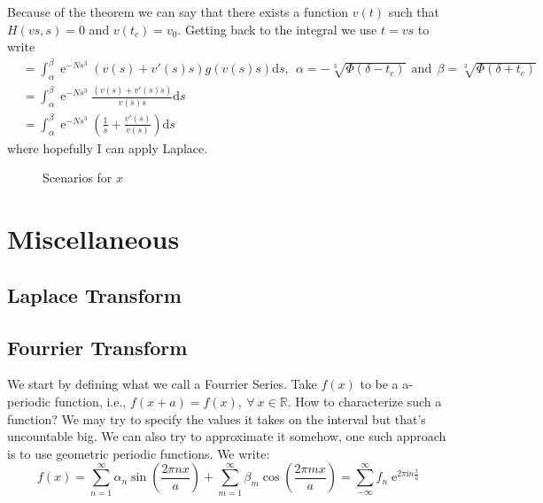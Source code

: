 \documentclass[]{report}
\DeclareMathOperator{\ee}{e}
\newcommand{\R}{\mathbb{R}}
\newcommand{\ii}{\mathrm{i}}
\newcommand{\dd}{\mathrm{d}}
\numberwithin{equation}{section} %
\begin{document}
Because of the theorem we can say that there exists a function $v(t)$ such that $H(vs, s) = 0$ and $v(t_c) = v_0$. Getting back to the integral we use $t = vs$ to write
\begin{equation}
	\begin{split}
		& = \int_{\alpha}^{\beta} \ee^{-Ns^3} (v(s) + v'(s)s) g(v(s)s) \dd s, \ \ \alpha = - \sqrt[3]{\Phi(\delta - t_c)} \ \ \text{and} \ \ \beta = \sqrt[3]{\Phi(\delta + t_c)} \\
		&  = \int_{\alpha}^{\beta} \ee^{-Ns^3} \frac{(v(s) + v'(s)s)}{v(s) s} \dd s \\
		& = \int_{\alpha}^{\beta} \ee^{-Ns^3} \left( \frac{1}{s} + \frac{v'(s)}{v(s)} \right) \dd s
	\end{split}
\end{equation}
where hopefully I can apply Laplace.

 
\begin{figure}[h] 
	\centering
	\caption{Scenarios for $x$}
	\label{Fig: x cases for hermite}
\end{figure}

\chapter{Miscellaneous}

\section{Laplace Transform}

\section{Fourrier Transform}

We start by defining what we call a Fourrier Series. Take $f(x)$ to be a a-periodic function, i.e., $f(x+a) = f(x), \ \forall \ x \in \R$. How to characterize such a function? We may try to specify the values it takes on the interval but that's uncountable big. We can also try to approximate it somehow, one such approach is to use geometric periodic functions. We write:
$$
f(x) = \sum_{n=1}^{\infty} \alpha_n \sin\left( \frac{2\pi n x}{a}\right) + \sum_{m=1}^{\infty} \beta_m \cos\left( \frac{2\pi m x}{a}\right) = \sum_{-\infty}^{\infty} f_n \ee^{2 \pi \ii n \frac{x}{a}}
$$
\end{document}

